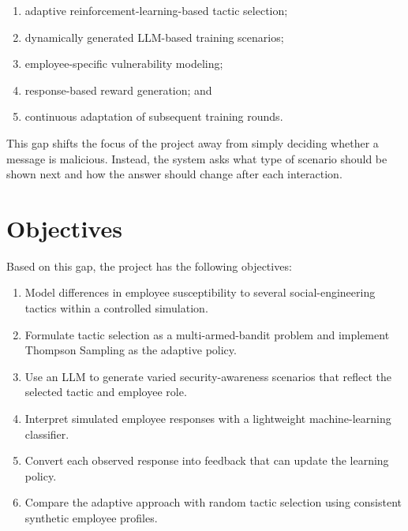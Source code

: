 \documentclass[12pt,a4paper]{article}
\begin{document}
\begin{enumerate}
    \item adaptive reinforcement-learning-based tactic selection;
    \item dynamically generated LLM-based training scenarios;
    \item employee-specific vulnerability modeling;
    \item response-based reward generation; and
    \item continuous adaptation of subsequent training rounds.
\end{enumerate}

This gap shifts the focus of the project away from simply deciding
whether a message is malicious. Instead, the system asks what type of
scenario should be shown next and how the answer should change after
each interaction.

\section{Objectives}

Based on this gap, the project has the following objectives:

\begin{enumerate}
    \item Model differences in employee susceptibility to several
    social-engineering tactics within a controlled simulation.

    \item Formulate tactic selection as a multi-armed-bandit problem
    and implement Thompson Sampling as the adaptive policy.

    \item Use an LLM to generate varied security-awareness scenarios
    that reflect the selected tactic and employee role.

    \item Interpret simulated employee responses with a lightweight
    machine-learning classifier.

    \item Convert each observed response into feedback that can update
    the learning policy.

    \item Compare the adaptive approach with random tactic selection
    using consistent synthetic employee profiles.
\end{enumerate}


\end{document}
